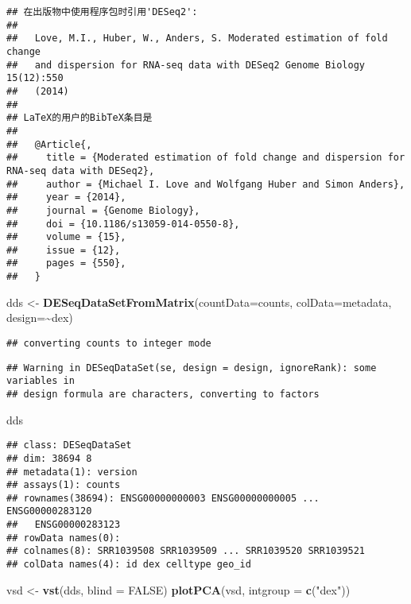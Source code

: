 \documentclass[
]{article}
\newenvironment{Shaded}{\begin{snugshade}}{\end{snugshade}}
\newcommand{\AttributeTok}[1]{\textcolor[rgb]{0.13,0.29,0.53}{#1}}
\newcommand{\ConstantTok}[1]{\textcolor[rgb]{0.56,0.35,0.01}{#1}}
\newcommand{\FunctionTok}[1]{\textcolor[rgb]{0.13,0.29,0.53}{\textbf{#1}}}
\newcommand{\NormalTok}[1]{#1}
\newcommand{\OtherTok}[1]{\textcolor[rgb]{0.56,0.35,0.01}{#1}}
\newcommand{\SpecialCharTok}[1]{\textcolor[rgb]{0.81,0.36,0.00}{\textbf{#1}}}
\newcommand{\StringTok}[1]{\textcolor[rgb]{0.31,0.60,0.02}{#1}}
\begin{document}
\begin{verbatim}
## 在出版物中使用程序包时引用'DESeq2':
## 
##   Love, M.I., Huber, W., Anders, S. Moderated estimation of fold change
##   and dispersion for RNA-seq data with DESeq2 Genome Biology 15(12):550
##   (2014)
## 
## LaTeX的用户的BibTeX条目是
## 
##   @Article{,
##     title = {Moderated estimation of fold change and dispersion for RNA-seq data with DESeq2},
##     author = {Michael I. Love and Wolfgang Huber and Simon Anders},
##     year = {2014},
##     journal = {Genome Biology},
##     doi = {10.1186/s13059-014-0550-8},
##     volume = {15},
##     issue = {12},
##     pages = {550},
##   }
\end{verbatim}

\begin{Shaded}
\begin{Highlighting}[]
\NormalTok{dds }\OtherTok{\textless{}{-}} \FunctionTok{DESeqDataSetFromMatrix}\NormalTok{(}\AttributeTok{countData=}\NormalTok{counts, }
                              \AttributeTok{colData=}\NormalTok{metadata, }
                              \AttributeTok{design=}\SpecialCharTok{\textasciitilde{}}\NormalTok{dex)}
\end{Highlighting}
\end{Shaded}

\begin{verbatim}
## converting counts to integer mode
\end{verbatim}

\begin{verbatim}
## Warning in DESeqDataSet(se, design = design, ignoreRank): some variables in
## design formula are characters, converting to factors
\end{verbatim}

\begin{Shaded}
\begin{Highlighting}[]
\NormalTok{dds}
\end{Highlighting}
\end{Shaded}

\begin{verbatim}
## class: DESeqDataSet 
## dim: 38694 8 
## metadata(1): version
## assays(1): counts
## rownames(38694): ENSG00000000003 ENSG00000000005 ... ENSG00000283120
##   ENSG00000283123
## rowData names(0):
## colnames(8): SRR1039508 SRR1039509 ... SRR1039520 SRR1039521
## colData names(4): id dex celltype geo_id
\end{verbatim}

\begin{Shaded}
\begin{Highlighting}[]
\NormalTok{vsd }\OtherTok{\textless{}{-}} \FunctionTok{vst}\NormalTok{(dds, }\AttributeTok{blind =} \ConstantTok{FALSE}\NormalTok{)}
\FunctionTok{plotPCA}\NormalTok{(vsd, }\AttributeTok{intgroup =} \FunctionTok{c}\NormalTok{(}\StringTok{"dex"}\NormalTok{))}
\end{Highlighting}
\end{Shaded}
\end{document}
